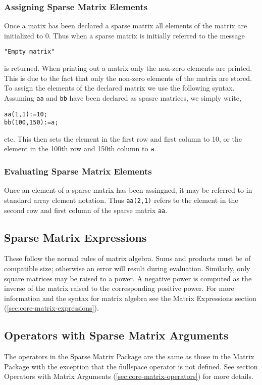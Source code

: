 \subsubsection{Assigning Sparse Matrix Elements}
Once a matix has been declared a sparse matrix all elements of the
matrix are initialized to 0. Thus when a sparse matrix is initially
referred to the message
\begin{verbatim}
"Empty matrix"
\end{verbatim}
is returned. When printing out a matrix only the non-zero elements are
printed. This is due to the fact that only the non-zero elements of the
matrix are stored.
To assign the elements of the declared matrix we use the following
syntax. Assuming \texttt{aa} and \texttt{bb} have been declared as spasre
matrices, we simply write,
\begin{verbatim}
aa(1,1):=10;
bb(100,150):=a;
\end{verbatim}
etc. This then sets the element in the first row and first column to 10,
or the element in the 100th row and 150th column to \texttt{a}.

\subsubsection{Evaluating Sparse Matrix Elements}
Once an element of a sparse matrix has been assingned, it may be referred
to in standard array element notation. Thus \texttt{aa(2,1)} refers to the
element in the second row and first column of the sparse matrix \texttt{aa}.

\subsection{Sparse Matrix Expressions}
These follow the normal rules of matrix algebra. Sums and products must
be of compatible size; otherwise an error will result during evaluation.
Similarly, only square matrices may be raised to a power.
A negative power is computed as the inverse of the matrix raised to the
corresponding positive power. For more information and the syntax for
matrix algebra see the Matrix Expressions section (\ref{sec:core-matrix-expressions}).

\subsection{Operators with Sparse Matrix Arguments}
The operators in the Sparse Matrix Package are the same as those in the
Matrix Package with the exception that the \f{nullspace} operator is
not defined. See section Operators with Matrix Arguments
(\ref{sec:core-matrix-operators}) for more details.

